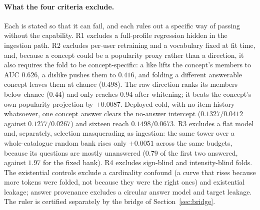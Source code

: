 \documentclass[manuscript,screen]{acmart}
\begin{document}
\paragraph{What the four criteria exclude.} Each is stated so that it can fail, and each rules out a specific way of passing without the capability. R1 excludes a full-profile regression hidden in the ingestion path. R2 excludes per-user retraining and a vocabulary fixed at fit time, and, because a concept could be a popularity proxy rather than a direction, it also requires the fold to be concept-specific: a like lifts the concept's members to AUC $0.626$, a dislike pushes them to $0.416$, and folding a different answerable concept leaves them at chance ($0.498$). The raw direction ranks its members below chance ($0.44$) and only reaches $0.94$ after whitening; it beats the concept's own popularity projection by $+0.0087$. Deployed cold, with no item history whatsoever, one concept answer clears the no-answer intercept ($0.1327/0.0412$ against $0.1277/0.0267$) and sixteen reach $0.1498/0.0673$. R3 excludes a flat model and, separately, selection masquerading as ingestion: the same tower over a whole-catalogue random bank rises only $+0.0051$ across the same budgets, because its questions are mostly unanswered ($0.79$ of the first two answered, against $1.97$ for the fixed bank). R4 excludes sign-blind and intensity-blind folds. The existential controls exclude a cardinality confound (a curve that rises because more tokens were folded, not because they were the right ones) and existential leakage; answer provenance excludes a circular answer model and target leakage. The ruler is certified separately by the bridge of Section~\ref{sec:bridge}.
\end{document}
